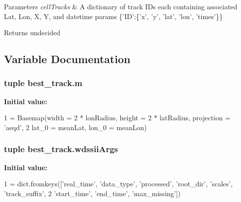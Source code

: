 \begin{DoxyParams}{Parameters}
{\em cell\-Tracks} & A dictionary of track I\-Ds each containing associated Lat, Lon, X, Y, and datetime params \{'I\-D'\-:\{'x', 'y', 'lat', 'lon', 'times'\}\} \\
\hline
\end{DoxyParams}
\begin{DoxyReturn}{Returns}
undecided 
\end{DoxyReturn}


\subsection{Variable Documentation}
\hypertarget{namespacebest__track_abe41241723275bf75520430095ad367e}{
\subsubsection[{m}]{\setlength{\rightskip}{0pt plus 5cm}tuple best\-\_\-track.\-m}}\label{namespacebest__track_abe41241723275bf75520430095ad367e}
{\bfseries Initial value\-:}
\begin{DoxyCode}
1 = Basemap(width = 2 * lonRadius, height = 2 * latRadius, projection = \textcolor{stringliteral}{'aeqd'},
2             lat\_0 = meanLat, lon\_0 = meanLon)
\end{DoxyCode}
\hypertarget{namespacebest__track_a3d860f4f32fd361d8531d097e4a4fbdd}{
\subsubsection[{wdssii\-Args}]{\setlength{\rightskip}{0pt plus 5cm}tuple best\-\_\-track.\-wdssii\-Args}}\label{namespacebest__track_a3d860f4f32fd361d8531d097e4a4fbdd}
{\bfseries Initial value\-:}
\begin{DoxyCode}
1 = dict.fromkeys([\textcolor{stringliteral}{'real\_time'}, \textcolor{stringliteral}{'data\_type'}, \textcolor{stringliteral}{'processed'}, \textcolor{stringliteral}{'root\_dir'}, \textcolor{stringliteral}{'scales'}, \textcolor{stringliteral}{'track\_suffix'}, 
2                     \textcolor{stringliteral}{'start\_time'}, \textcolor{stringliteral}{'end\_time'}, \textcolor{stringliteral}{'max\_missing'}])
\end{DoxyCode}
